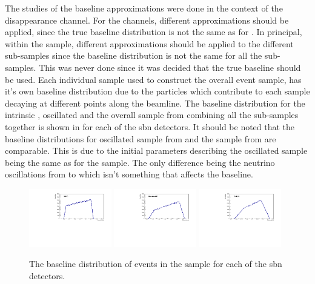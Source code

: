 The studies of the baseline approximations were done in the context of the \numu disappearance channel. For the \nue channels, different approximations should be applied, since the true baseline distribution is not the same as for \numu. In principal, within the \nue sample, different approximations should be applied to the different sub-samples since the baseline distribution is not the same for all the sub-samples. This was never done since it was decided that the true baseline should be used. Each individual sample used to construct the overall \nue event sample, has it's own baseline distribution due to the particles which contribute to each sample decaying at different points along the beamline. The baseline distribution for the intrinsic \nue, oscillated \nue and the overall \nue sample from combining all the sub-samples together is shown in  for each of the \gls{sbn} detectors. It should be noted that the baseline distributions for oscillated \nue sample from  and the \numu sample from  are comparable. This is due to the initial parameters describing the oscillated sample being the same as for the \numu sample. The only difference being the neutrino oscillations from \numu to \nue which isn't something that affects the baseline.

\begin{figure}[!h]
    \centering
    \includegraphics[width = 0.32\textwidth]{figures-chap5/SBND_numu.pdf}
    \includegraphics[width = 0.32\textwidth]{figures-chap5/MicroBooNE_numu.pdf}
    \includegraphics[width = 0.32\textwidth]{figures-chap5/ICARUS_numu.pdf}
    \caption{The baseline distribution of events in the \numu sample for each of the \gls{sbn} detectors.}
    \label{fig:numu_baseline}
\end{figure}

